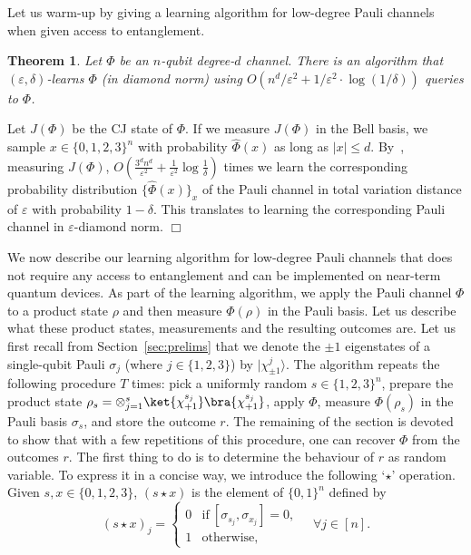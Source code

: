 \documentclass[11pt]{article}
\theoremstyle{plain}
\newtheorem{theorem}{Theorem}
\theoremstyle{plain}
\theoremstyle{definition}
\theoremstyle{remark}
\renewenvironment{proof}[1][]{
    \begin{trivlist}
    \item[\hspace{\labelsep}{\em\noindent Proof#1:\/}]}
    {{\hfill$\Box$}
    \end{trivlist}
}
\theoremstyle{named}
\begin{document}
Let us warm-up by giving a learning algorithm for low-degree Pauli channels when given access to entanglement.
\begin{theorem}
    Let $\Phi$ be an $n$-qubit degree-$d$ channel. There is an algorithm that $(\varepsilon,
    \delta)$-learns $\Phi$ (in  diamond norm)  using $O\left( n^d/{\varepsilon^2} + 1/\varepsilon^2\cdot \log({1}/{\delta})\right)$ queries to $\Phi$.
\end{theorem}
\begin{proof}
    Let $J(\Phi)$ be the CJ state of $\Phi$. If we measure $J(\Phi)$ in the Bell basis, we sample $x \in \{0,1,2,3\}^n$ with probability $\widehat{\Phi}(x)$ as long as $|x| \leq d$. By~\cite[Theorem 1]{canonne2020short}, measuring $J(\Phi)$, $O\left(\frac{3^d n^d}{\varepsilon^2} + \frac{1}{\varepsilon^2}\log\frac{1}{\delta} \right)$ times we learn the corresponding probability distribution $\{\widehat{\Phi}(x)\}_x$ of the Pauli channel in total variation distance of $\varepsilon$ with probability $1-\delta$. This translates to learning the corresponding Pauli channel in $\varepsilon$-diamond norm.
\end{proof}



We now describe our learning algorithm for low-degree Pauli channels that does not require any access to entanglement and can be implemented on near-term quantum devices. As part of the learning algorithm, we apply the Pauli channel $\Phi$ to a product state $\rho$ and then measure $\Phi(\rho)$ in the Pauli basis. Let us describe what these product states, measurements and the resulting outcomes are. Let us first recall from Section~\ref{sec:prelims} that we denote the $\pm 1$ eigenstates of a single-qubit Pauli $\sigma_j$ (where $j \in \{1,2,3\}$) by $|\chi_{\pm 1}^{j}\rangle$. The algorithm repeats the following procedure $T$ times: pick a uniformly random $s
\in \{1,2,3\}^n$, prepare the product state $\rho_s = \otimes_{j=1}^s \ket{\chi_{+1}^{s_j}}\bra{\chi_{+1}^{s_j}}$, apply $\Phi$, measure $\Phi(\rho_s)$ in the Pauli basis $\sigma_s$, and store the outcome $r$. The remaining of the section is devoted to show that with a few repetitions of this procedure, one can recover $\Phi$ from the outcomes $r$. The first thing to do is to determine the behaviour of $r$ as random variable. To express it in a concise way, we introduce the following `$\star$' operation. Given $s,x\in\{0,1,2,3\}$, $(s\star x)$ is the element of $\{0,1\}^n$ defined by 
\begin{equation}\label{eq:stardefinition}
    (s\star x)_j=\left\{\begin{array}{ll}
         0 &
        \mathrm{if}\ [\sigma_{s_j},\sigma_{x_j}]=0,  \\
         1 & \mathrm{otherwise},
    \end{array}\right.
    \quad \forall j \in [n].
\end{equation}
\end{document}
